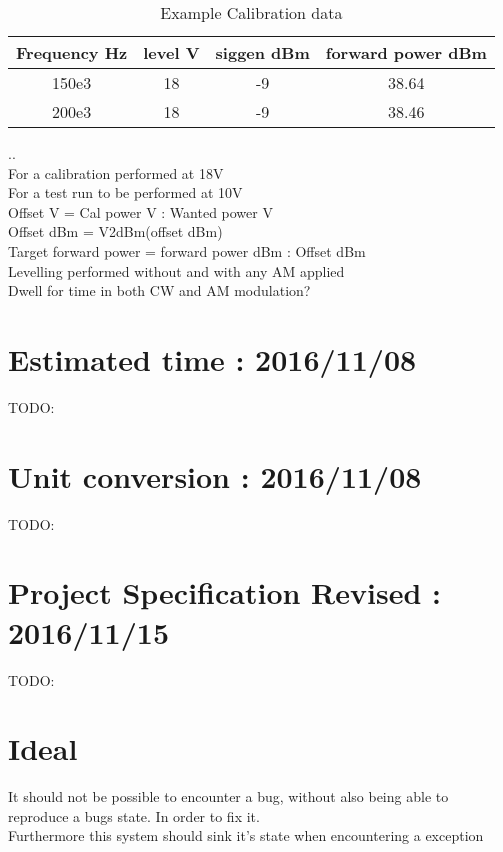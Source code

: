 \documentclass[a4paper]{article}
\begin{document}
\begin{table}[h!]
\centering
\begin{tabular}{||c c c c||}
 \hline
 Frequency Hz & level V & siggen dBm & forward power dBm \\ [0.5ex]
 \hline
 150e3 & 18 & -9 & 38.64 \\
 200e3 & 18 & -9 & 38.46 \\
 \hline
\end{tabular}
\caption{Example Calibration data}
\label{table:1}
\end{table}
..\\
For a calibration performed at 18V\\
For a test run to be performed at 10V\\
Offset V = Cal power V : Wanted power V\\
Offset dBm = V2dBm(offset dBm)\\
Target forward power = forward power dBm : Offset dBm\\

Levelling performed without and with any AM applied\\
Dwell for time in both CW and AM modulation?\\

\section{Estimated time : 2016/11/08}
TODO:

\section{Unit conversion : 2016/11/08}
TODO:

\section{Project Specification Revised : 2016/11/15}
TODO:

\section{Ideal}
It should not be possible to encounter a bug, without also being able to reproduce a bugs state. In order to fix it.\\
Furthermore this system should sink it's state when encountering a exception\\

\newpage
\newpage

\newpage\glsaddall\printglossaries
\end{document}
